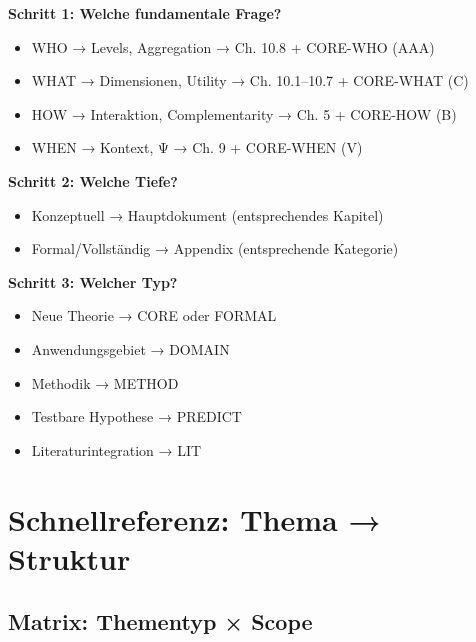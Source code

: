 \documentclass[12pt,a4paper]{article}
\begin{document}
\begin{tcolorbox}[colback=red!5!white, colframe=red!75!black, 
    title=Entscheidungsbaum: Wo gehört ein Thema hin?]

\textbf{Schritt 1: Welche fundamentale Frage?}
\begin{itemize}[nosep]
\item WHO → Levels, Aggregation → Ch. 10.8 + CORE-WHO (AAA)
\item WHAT → Dimensionen, Utility → Ch. 10.1--10.7 + CORE-WHAT (C)
\item HOW → Interaktion, Complementarity → Ch. 5 + CORE-HOW (B)
\item WHEN → Kontext, Ψ → Ch. 9 + CORE-WHEN (V)
\end{itemize}

\textbf{Schritt 2: Welche Tiefe?}
\begin{itemize}[nosep]
\item Konzeptuell → Hauptdokument (entsprechendes Kapitel)
\item Formal/Vollständig → Appendix (entsprechende Kategorie)
\end{itemize}

\textbf{Schritt 3: Welcher Typ?}
\begin{itemize}[nosep]
\item Neue Theorie → CORE oder FORMAL
\item Anwendungsgebiet → DOMAIN
\item Methodik → METHOD
\item Testbare Hypothese → PREDICT
\item Literaturintegration → LIT
\end{itemize}

\end{tcolorbox}

\section{Schnellreferenz: Thema → Struktur}

\subsection{Matrix: Thementyp × Scope}
\end{document}
